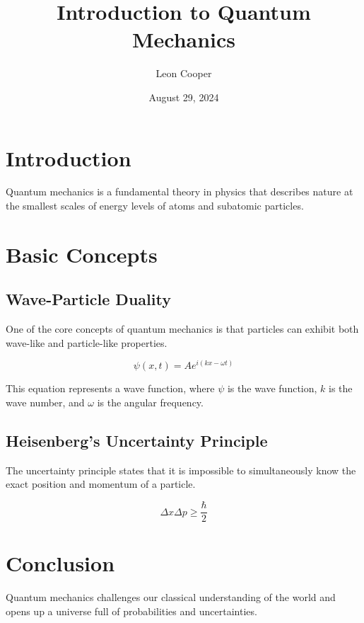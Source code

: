 \documentclass{article}
\title{Introduction to Quantum Mechanics}
\author{Leon Cooper}
\date{August 29, 2024}
\begin{document}
\maketitle

\section{Introduction}
Quantum mechanics is a fundamental theory in physics that describes nature at the smallest scales of energy levels of atoms and subatomic particles.

\section{Basic Concepts}
\subsection{Wave-Particle Duality}
One of the core concepts of quantum mechanics is that particles can exhibit both wave-like and particle-like properties.

\begin{equation}
\psi(x,t) = A e^{i(kx - \omega t)}
\end{equation}

This equation represents a wave function, where \( \psi \) is the wave function, \( k \) is the wave number, and \( \omega \) is the angular frequency.

\subsection{Heisenberg's Uncertainty Principle}
The uncertainty principle states that it is impossible to simultaneously know the exact position and momentum of a particle.

\begin{equation}
\Delta x \Delta p \geq \frac{\hbar}{2}
\end{equation}

\section{Conclusion}
Quantum mechanics challenges our classical understanding of the world and opens up a universe full of probabilities and uncertainties.
\end{document}

